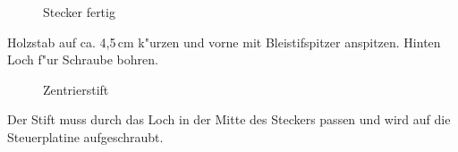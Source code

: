 \documentclass[ngerman,11pt,parskip=half] {scrartcl}
\begin{document}
\begin{figure}[H]
\centering
{}
\hspace{1cm} %
\caption{Stecker fertig} \label{fig:1}
\end{figure}

Holzstab auf ca. 4,5\,cm k"urzen und vorne mit Bleistifspitzer anspitzen. Hinten Loch f"ur Schraube bohren.

\begin{figure}[H]
\centering
{}
\caption{Zentrierstift} \label{fig:1}
\end{figure}

Der Stift muss durch das Loch in der Mitte des Steckers passen und wird auf die Steuerplatine aufgeschraubt.
\end{document}
